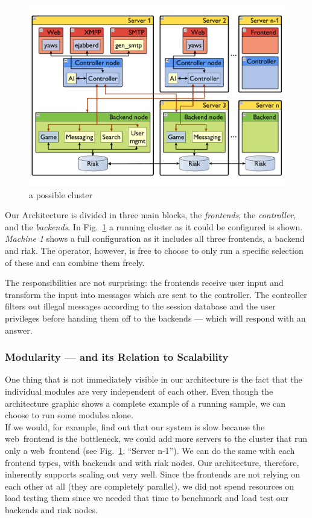 \documentclass[11pt,a4paper]{report}
\begin{document}
\begin{figure}[h]
 \centering
 \includegraphics[width=13cm]{./graphics/arch.pdf}
 \caption{a possible cluster}
 \label{fig:arch}
\end{figure}

Our Architecture is divided in three main blocks, the {\em frontends}, the
{\em controller}, and the {\em backends}. In Fig.~\ref{fig:arch} a running
cluster as it could be configured is shown. {\em Machine 1} shows a full
configuration as it includes all three frontends, a backend and riak. The
operator, however, is free to choose to only run a specific selection of these
and can combine them freely.

The responsibilities are not surprising: the frontends receive user input and
transform the input into messages which are sent to the controller.
The controller filters out illegal messages according to the session database
and the user privileges before handing them off to the backends --- which will
respond with an answer.
\subsubsection{Modularity --- and its Relation to Scalability}
One thing that is not immediately visible in our architecture is the fact that
the individual modules are very independent of each other. Even though the
architecture graphic shows a complete example of a running sample, we can choose
to run some modules alone. \\
If we would, for example, find out that our system is slow because the
web~frontend is the bottleneck, we could add more servers to the cluster that
run only a web~frontend (see Fig.~\ref{fig:arch}, ``Server n-1'').
We can do the same with each frontend types, with backends and with riak nodes.
Our architecture, therefore, inherently supports scaling out very well.
Since the frontends are not relying on each other at all (they are completely
parallel), we did not spend resources on load testing them since we needed that
time to benchmark and load test our backends and riak nodes.
\end{document}
